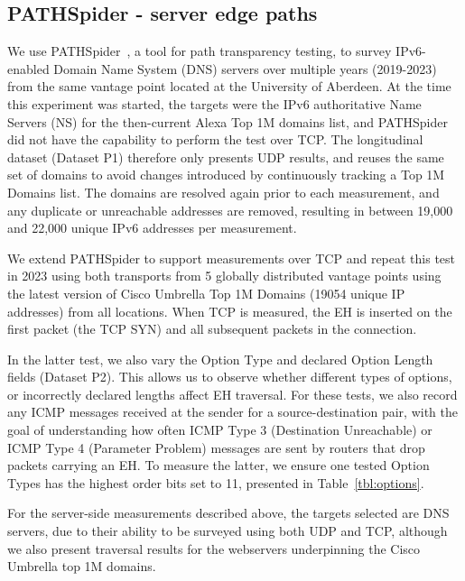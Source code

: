 \documentclass[conference]{IEEEtran}
\begin{document}
    \subsection{PATHSpider - server edge paths}
    \label{sec:pathspider-methodology}

We use PATHSpider~\cite{learmonth2016pathspider}, a tool for path transparency testing, to survey IPv6-enabled Domain Name System (DNS) servers over multiple years (2019-2023) from the same vantage point located at the University of Aberdeen. At the time this experiment was started, the targets were the IPv6 authoritative Name Servers (NS) for the then-current Alexa Top 1M domains list, and PATHSpider did not have the capability to perform the test over TCP. The longitudinal dataset (Dataset P1) therefore only presents UDP results, and reuses the same set of domains to avoid changes introduced by continuously tracking a Top 1M Domains list. The domains are resolved again prior to each measurement, and any duplicate or unreachable addresses are removed, resulting in between 19,000 and 22,000 unique IPv6 addresses per measurement. 

We extend PATHSpider to support measurements over TCP and repeat this test in 2023 using both transports from 5 globally distributed vantage points using the latest version of Cisco Umbrella Top 1M Domains (19054 unique IP addresses) from all locations. When TCP is measured, the EH is inserted on the first packet (the TCP SYN) and all subsequent packets in the connection.

In the latter test, we also vary the Option Type and declared Option Length fields (Dataset P2). This allows us to observe whether different types of options, or incorrectly declared lengths affect EH traversal. For these tests, we also record any ICMP messages received at the sender for a source-destination pair, with the goal of understanding how often ICMP Type 3 (Destination Unreachable) or ICMP Type 4 (Parameter Problem) messages are sent by routers that drop packets carrying an EH. To measure the latter, we ensure one tested Option Types has the highest order bits set to 11, presented in Table~\ref{tbl:options}.


For the server-side measurements described above, the targets selected are DNS servers, due to their ability to be surveyed using both UDP and TCP, although we also present traversal results for the webservers underpinning the Cisco Umbrella top 1M domains.
\end{document}

